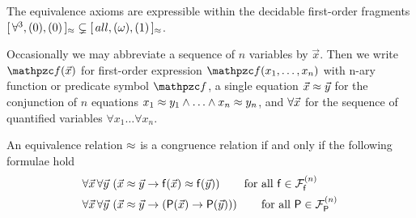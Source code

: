 \begin{remark}
	The equivalence axioms are expressible within
	the decidable first-order fragments
	\(
		[ \, \forall^3, (0), (0) \, ]{}_{\approx}
		\subsetneq
		[ \, all, (\omega), (1) \, ]{}_{\approx}
	\).
\end{remark}


\begin{definition}
	Occasionally we may abbreviate a sequence of \( n \) variables by \( \vec{x} \).
	Then we write \( \mcf(\vecn{x}) \)
	for first-order expression \( \mcf(x_1,\ldots,x_n) \)
	with n-ary function or predicate symbol \( \mcf \),
	a single equation \( \vec{x}\approx\vec{y} \) for
	the conjunction of \( n \) equations
	\( x_1\approx y_1\land\ldots\land x_n\approx y_n \),
	and \( \forall\vec{x} \) for
	the sequence of quantified variables \( \forall x_1\ldots\forall x_n \).
\end{definition}

\begin{definition}
	 An equivalence relation \( \approx \) is a congruence relation if and only if
	the following formulae hold\label{def:congruence:schemata}
	\begin{align*}
	\forall\vecn{x}\,\forall\vecn{y}\,
	&\left(\vecn{x}\mEQ\vecn{y} \limp \mf(\vecn{x}) \mEQ \mf(\vecn{y}) \right)
	\tag*{for all \( \mf\in\mcFfn \)}
	\\
	\forall\vecn{x}\,\forall\vecn{y}\,
	&\left(\vecn{x}\mEQ\vecn{y} \limp (\mP(\vecn{x}) \limp \mP(\vecn{y}))\right)
	\tag*{for all \( \mP\in\mcFPn \)}
	\end{align*}
\end{definition}

